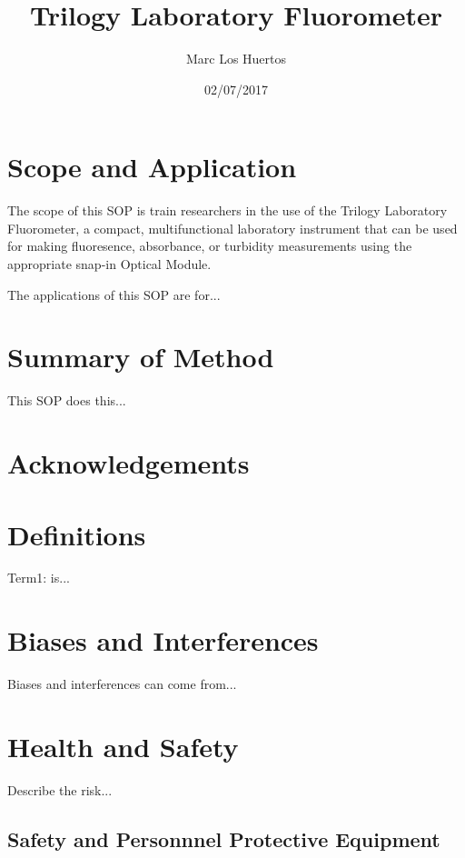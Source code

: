 \documentclass[12pt]{../SOP3_beta}
\title{Trilogy Laboratory Fluorometer}
\date{02/07/2017}
\author{Marc Los Huertos}
\begin{document}


\maketitle

\section{Scope and Application}

\NP The scope of this SOP is train researchers in the use of the Trilogy Laboratory Fluorometer, a compact, multifunctional laboratory instrument that can be used for making fluoresence, absorbance, or turbidity measurements using the appropriate snap-in Optical Module. 

\NP The applications of this SOP are for...

\section{Summary of Method}

\NP This SOP does this...

\tableofcontents

\newpage

\section{Acknowledgements}

\section{Definitions}

\NP Term1: is...

\section{Biases and Interferences}

\NP Biases and interferences can come from...

\section{Health and Safety}

\NP Describe the risk...


\subsection{Safety and Personnnel Protective Equipment}
\end{document}
